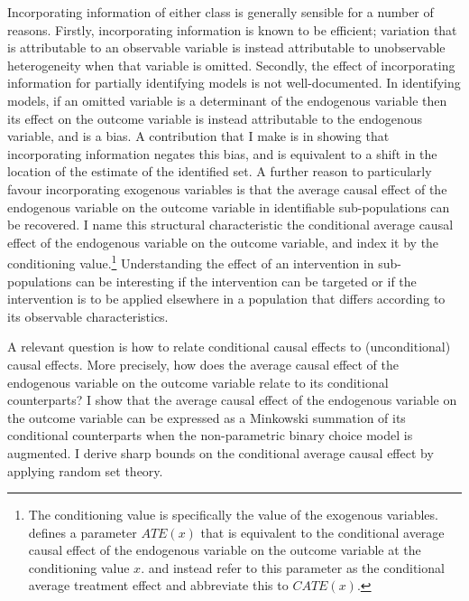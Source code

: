 \documentclass[12pt,a4paper,twoside]{article}
\numberwithin{equation}{section}
\begin{document}
Incorporating information of either class is generally sensible for a number of reasons. Firstly, incorporating information is known to be efficient; variation that is attributable to an observable variable is instead attributable to unobservable heterogeneity when that variable is omitted. Secondly, the effect of incorporating information for partially identifying models is not well-documented. In identifying models, if an omitted variable is a determinant of the endogenous variable then its effect on the outcome variable is instead attributable to the endogenous variable, and is a bias. A contribution that I make is in showing that incorporating information negates this bias, and is equivalent to a shift in the location of the estimate of the identified set. A further reason to particularly favour incorporating exogenous variables is that the average causal effect of the endogenous variable on the outcome variable in identifiable sub-populations can be recovered. I name this structural characteristic the conditional average causal effect of the endogenous variable on the outcome variable, and index it by the conditioning value.\footnote{The conditioning value is specifically the value of the exogenous variables. \cite{hEvY05} defines a parameter $ATE(x)$ that is equivalent to the conditional average causal effect of the endogenous variable on the outcome variable at the conditioning value $x$. \cite{kHt10} and \cite{13.misc.abrevaya} instead refer to this parameter as the conditional average treatment effect and abbreviate this to $CATE(x)$.} Understanding the effect of an intervention in sub-populations can be interesting if the intervention can be targeted or if the intervention is to be applied elsewhere in a population that differs according to its observable characteristics. 

A relevant question is how to relate conditional causal effects to (unconditional) causal effects. More precisely, how does the average causal effect of the endogenous variable on the outcome variable relate to its conditional counterparts? I show that the average causal effect of the endogenous variable on the outcome variable can be expressed as a Minkowski summation of its conditional counterparts when the non-parametric binary choice model is augmented. I derive sharp bounds on the conditional average causal effect by applying random set theory. 
\end{document}
